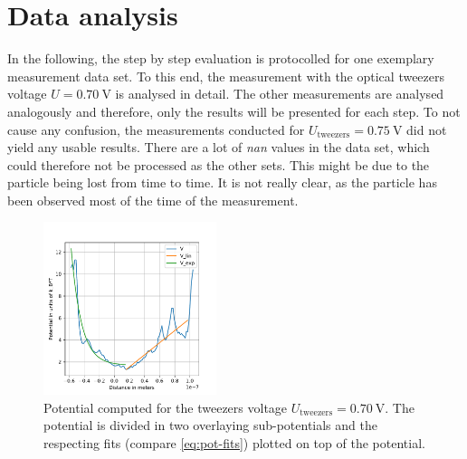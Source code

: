 \documentclass[../bericht.tex]{subfiles}
\begin{document}
    \section{Data analysis}
    \label{sec:data-analysis}

      In the following, the step by step evaluation is protocolled for one exemplary measurement data set. To this end, the measurement with the optical tweezers voltage $U=\SI{0,70}{\volt}$ is analysed in detail. The other measurements are analysed analogously and therefore, only the results will be presented for each step. To not cause any confusion, the measurements conducted for $U_\mathrm{tweezers}=\SI{0,75}{\volt}$ did not yield any usable results. There are a lot of \textit{nan} values in the data set, which could therefore not be processed as the other sets. This might be due to the particle being lost from time to time. It is not really clear, as the particle has been observed most of the time of the measurement.
      \medskip

      \begin{figure}[tb]
        \centering
        \includegraphics[width=0.45\textwidth]{figures/70_potential.pdf}
        \caption[Potential computed for the tweezers voltage $U_\mathrm{tweezers}=\SI{0,70}{\volt}$.]{Potential computed for the tweezers voltage $U_\mathrm{tweezers}=\SI{0,70}{\volt}$. The potential is divided in two overlaying sub-potentials and the respecting fits (compare \cref{eq:pot-fits}) plotted on top of the potential.}
        \label{fig:potential-with-fits-70}
      \end{figure}
\end{document}
